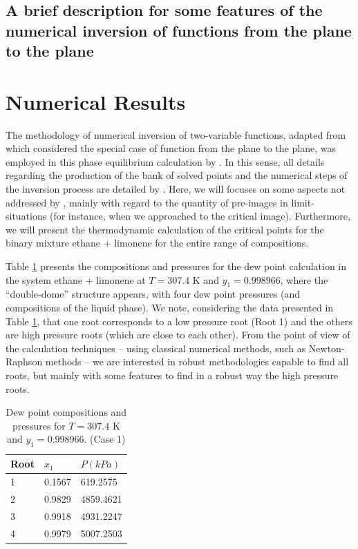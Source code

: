 \documentclass[journal=iecred,manuscript=article]{achemso}
\theoremstyle{definition}
\theoremstyle{remark}
\begin{document}
\subsection{A brief description for some features of the numerical inversion of functions from the plane to the plane}


\section{Numerical Results}

The methodology of numerical inversion of two-variable functions, adapted from \citet{malta} which considered the special case of function from the plane to the plane,
 was employed in this phase equilibrium calculation by \citet{ireme}. In this sense, all details regarding the production of the bank of solved points and the numerical steps of the inversion process are detailed by \citet{ireme}. Here, we will focuses on some aspects not addressed by \citet{ireme}, mainly with regard
 to the quantity of pre-images in  limit-situations (for instance, when we approached to the critical image). Furthermore, we will present the thermodynamic calculation of the critical points for the binary mixture ethane + limonene for the entire range of compositions.
 
Table \ref{tab:roots_double_dome} presents the compositions and pressures for the dew point calculation in the system ethane + limonene at $T = 307.4$ K and $y_1 = 0.998966$, where the \enquote{double-dome} structure appears, with four dew point pressures (and compositions of the liquid phase). We note, considering the data presented in Table \ref{tab:roots_double_dome}, that one root corresponds to a low pressure root (Root 1) and the others are high pressure roots (which are close to each other). From the point of view of the calculation techniques -- using classical numerical methods, such as Newton-Raphson methods -- we are interested in robust methodologies capable to find all roots, but mainly with some features to find in a robust way the high pressure roots.

\begin{table}
  \caption{Dew point compositions and pressures for $T = 307.4$ K and $y_1 = 0.998966$. (Case 1)}
  \label{tab:roots_double_dome}
  \begin{tabular}{lll}
  \hline
    Root & $ x_{1} $ & $ P \left( kPa \right) $ \\
    \hline
    1 & 0.1567 & 619.2575 \\
    2 & 0.9829 & 4859.4621 \\
    3 & 0.9918 & 4931.2247 \\
    4 & 0.9979 & 5007.2503 \\
    \hline
  \end{tabular}
\end{table}
\end{document}
